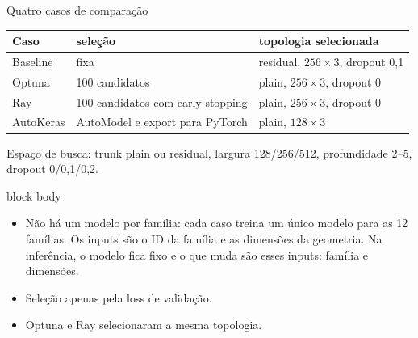\documentclass[aspectratio=169,11pt]{beamer}
\newcommand{\resumo}[1]{\begin{beamercolorbox}[rounded=true,sep=.5ex]{block body}\small\begin{itemize}\setlength\itemsep{0pt}#1\end{itemize}\end{beamercolorbox}}
\begin{document}
\begin{frame}{Quatro casos de comparação}
  {\small\centering
  \begin{tabular}{lll}
    \toprule Caso & seleção & topologia selecionada\\\midrule
    Baseline & fixa & residual, $256\times3$, dropout 0,1\\
    Optuna & 100 candidatos & plain, $256\times3$, dropout 0\\
    Ray & 100 candidatos com early stopping & plain, $256\times3$, dropout 0\\
    AutoKeras & AutoModel e export para PyTorch & plain, $128\times3$\\\bottomrule
  \end{tabular}\par}
  \vspace{1.5ex}
  {\centering\small Espaço de busca: trunk plain ou residual, largura 128/256/512, profundidade 2--5, dropout 0/0,1/0,2.\par}
  \vfill
  \resumo{
    \item Não há um modelo por família: cada caso treina um único modelo para as 12 famílias. Os inputs são o ID da família e as dimensões da geometria. Na inferência, o modelo fica fixo e o que muda são esses inputs: família e dimensões.
    \item Seleção apenas pela loss de validação.
    \item Optuna e Ray selecionaram a mesma topologia.}
\end{frame}
\end{document}
